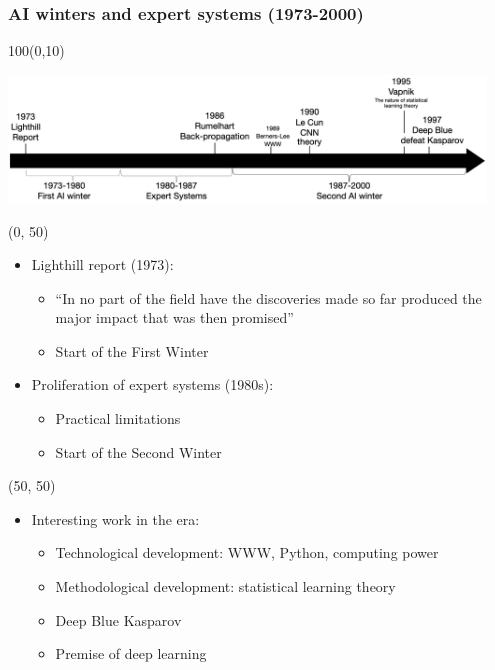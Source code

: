 \begin{frame}
  \frametitle{AI winters and expert systems (1973-2000)}

  \begin{textblock}{100}(0,10)
    \begin{center}
      \includegraphics[width=0.95\textwidth]{img/ai_history_1973_2000.png}
    \end{center}
  \end{textblock}

  \begin{textblock}{50}(0, 50)
    \begin{itemize}
    \item Lighthill report (1973):
      \begin{itemize}
      \item {\footnotesize ``In no part of the field have the discoveries made so far produced the major impact that was then promised''}
      \item Start of the First Winter
      \end{itemize}
    \item<2-> Proliferation of expert systems (1980s):
      \begin{itemize}
      \item Practical limitations
      \item Start of the Second Winter
      \end{itemize}
    \end{itemize}
  \end{textblock}

  \begin{textblock}{50}(50, 50)
    \begin{itemize}
      \item<3-> Interesting work in the era:
      \begin{itemize}
      \item Technological development: WWW, Python, computing power
      \item Methodological development: statistical learning theory
      \item Deep Blue \vs{} Kasparov
      \item Premise of deep learning
      \end{itemize}
    \end{itemize}
  \end{textblock}

\end{frame}


